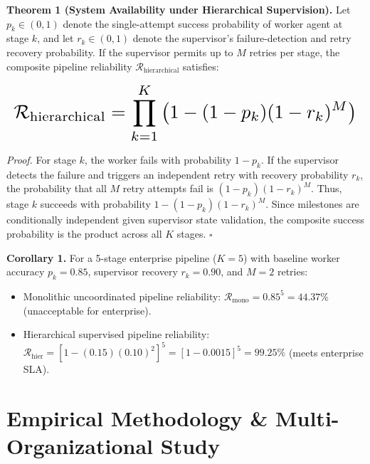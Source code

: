 \documentclass[10pt,twocolumn,letterpaper]{article}
\begin{document}
\textbf{Theorem 1 (System Availability under Hierarchical Supervision).} Let $p_k \in (0, 1)$ denote the single-attempt success probability of worker agent at stage $k$, and let $r_k \in (0, 1)$ denote the supervisor's failure-detection and retry recovery probability. If the supervisor permits up to $M$ retries per stage, the composite pipeline reliability $\mathcal{R}_{\text{hierarchical}}$ satisfies:








\begin{equation}
\resizebox{\columnwidth}{!}{$\displaystyle
\begin{aligned}
\mathcal{R}_{\text{hierarchical}} = \prod_{k=1}^K \left( 1 - (1 - p_k)(1 - r_k)^M \right)
\end{aligned}
$}
\end{equation}








\textit{Proof.} For stage $k$, the worker fails with probability $1 - p_k$. If the supervisor detects the failure and triggers an independent retry with recovery probability $r_k$, the probability that all $M$ retry attempts fail is $(1 - p_k)(1 - r_k)^M$. Thus, stage $k$ succeeds with probability $1 - (1 - p_k)(1 - r_k)^M$. Since milestones are conditionally independent given supervisor state validation, the composite success probability is the product across all $K$ stages. $\square$

\textbf{Corollary 1.} For a 5-stage enterprise pipeline ($K = 5$) with baseline worker accuracy $p_k = 0.85$, supervisor recovery $r_k = 0.90$, and $M = 2$ retries:
\begin{itemize}
  \item Monolithic uncoordinated pipeline reliability: $\mathcal{R}_{\text{mono}} = 0.85^5 = 44.37\%$ (unacceptable for enterprise).
  \item Hierarchical supervised pipeline reliability: $\mathcal{R}_{\text{hier}} = [1 - (0.15)(0.10)^2]^5 = [1 - 0.0015]^5 = 99.25\%$ (meets enterprise SLA).
\end{itemize}




\section{Empirical Methodology \& Multi-Organizational Study}
\end{document}
